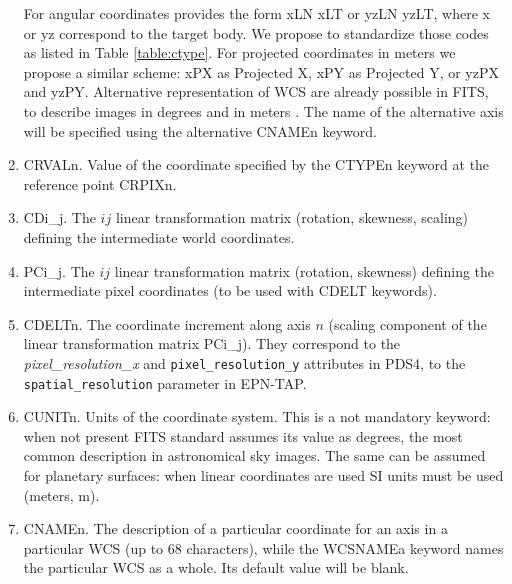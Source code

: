 \begin{enumerate}
{For angular coordinates \citet{calagreisenI} provides the form xLN xLT or yzLN yzLT,
where x or yz correspond to the target body.
We propose to standardize those codes as listed in Table \ref{table:ctype}.
For projected coordinates in meters we propose a similar scheme: xPX as Projected X,
xPY as Projected Y, or yzPX and yzPY.
Alternative representation of WCS are already possible in FITS, to describe images in
degrees and in meters \citep{greisencalaII}.
The name of the alternative axis will be specified using the alternative CNAMEn
keyword.}
\item{CRVALn.
Value of the coordinate specified by the CTYPEn keyword at the reference point CRPIXn.}
\item{CDi\_j.
The $ij$ linear transformation matrix (rotation, skewness, scaling) defining the
intermediate world coordinates.}
\item{PCi\_j.
The $ij$ linear transformation matrix (rotation, skewness) defining the intermediate
pixel coordinates (to be used with CDELT keywords).}
\item{CDELTn.
The coordinate increment along axis $n$ (scaling component of the linear transformation
matrix PCi\_j).
They correspond to the \textit{pixel\_resolution\_x} and
\texttt{pixel\_resolution\_y} attributes in PDS4, to the \texttt{spatial\_resolution} parameter
in EPN-TAP.}
\item{CUNITn.
Units of the coordinate system. This is a not mandatory keyword: when not present FITS standard
assumes its value as degrees, the most common description in astronomical sky images.
The same can be assumed for planetary surfaces: when linear coordinates are used SI units must
be used (meters, m).}
\item{CNAMEn.
The description of a particular coordinate for an axis in a particular WCS (up to 68
characters), while the WCSNAMEa keyword names the particular WCS as a whole.
Its default value will be blank.}
\end{enumerate}

